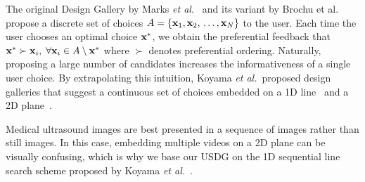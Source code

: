 The original Design Gallery by Marks \textit{et al.}~\cite{10.1145/258734.258887} and its variant by Brochu et al.~\cite{brochu_bayesian_2010} propose a discrete set of choices \(A = \{\mathbf{x}_1, \mathbf{x}_2,{\,\ldots\,}, \mathbf{x}_N\}\) to the user.
Each time the user chooses an optimal choice \(\mathbf{x}^*\), we obtain the preferential feedback that \(\mathbf{x}^* \succ \mathbf{x}_i,\; \forall\mathbf{x}_i \in A \setminus \mathbf{x}^* \) where \(\succ\) denotes preferential ordering.
Naturally, proposing a large number of candidates increases the informativeness of a single user choice.
By extrapolating this intuition, Koyama \textit{et al.}~proposed design galleries that suggest a continuous set of choices embedded on a 1D line~\cite{10.1145/3072959.3073598} and a 2D plane~\cite{koyama_sequential_2020}.

Medical ultrasound images are best presented in a sequence of images rather than still images.
In this case, embedding multiple videos on a 2D plane can be visually confusing, which is why we base our USDG on the 1D sequential line search scheme proposed by Koyama \textit{et al.}~\cite{10.1145/3072959.3073598}.

